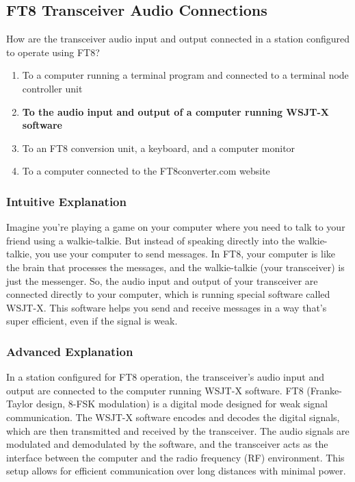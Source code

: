 \subsection{FT8 Transceiver Audio Connections}
\label{T4A04}

\begin{tcolorbox}[colback=gray!10!white,colframe=black!75!black,title=T4A04]
How are the transceiver audio input and output connected in a station configured to operate using FT8?
\begin{enumerate}[label=\Alph*]
    \item To a computer running a terminal program and connected to a terminal node controller unit
    \item \textbf{To the audio input and output of a computer running WSJT-X software}
    \item To an FT8 conversion unit, a keyboard, and a computer monitor
    \item To a computer connected to the FT8converter.com website
\end{enumerate}
\end{tcolorbox}

\subsubsection{Intuitive Explanation}
Imagine you’re playing a game on your computer where you need to talk to your friend using a walkie-talkie. But instead of speaking directly into the walkie-talkie, you use your computer to send messages. In FT8, your computer is like the brain that processes the messages, and the walkie-talkie (your transceiver) is just the messenger. So, the audio input and output of your transceiver are connected directly to your computer, which is running special software called WSJT-X. This software helps you send and receive messages in a way that’s super efficient, even if the signal is weak.

\subsubsection{Advanced Explanation}
In a station configured for FT8 operation, the transceiver’s audio input and output are connected to the computer running WSJT-X software. FT8 (Franke-Taylor design, 8-FSK modulation) is a digital mode designed for weak signal communication. The WSJT-X software encodes and decodes the digital signals, which are then transmitted and received by the transceiver. The audio signals are modulated and demodulated by the software, and the transceiver acts as the interface between the computer and the radio frequency (RF) environment. This setup allows for efficient communication over long distances with minimal power.

